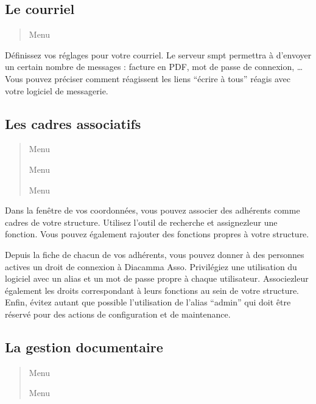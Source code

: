 \documentclass[a4paper,10pt,oneside,french]{sphinxmanual}
\begin{document}
\subsection{Le courriel}
\label{\detokenize{asso/first_step:le-courriel}}\begin{quote}

\sphinxAtStartPar
Menu 
\end{quote}

\sphinxAtStartPar
Définissez vos réglages pour votre courriel.
Le serveur smpt permettra à  d’envoyer un certain nombre de messages : facture en PDF, mot de passe de connexion, …
Vous pouvez préciser comment réagissent les liens “écrire à tous” réagis avec votre logiciel de messagerie.


\subsection{Les cadres associatifs}
\label{\detokenize{asso/first_step:les-cadres-associatifs}}\begin{quote}

\sphinxAtStartPar
Menu 

\sphinxAtStartPar
Menu 

\sphinxAtStartPar
Menu 
\end{quote}

\sphinxAtStartPar
Dans la fenêtre de vos coordonnées, vous pouvez associer des adhérents comme cadres de votre structure.
Utilisez l’outil de recherche et assignez\sphinxhyphen{}leur une fonction.
Vous pouvez également rajouter des fonctions propres à votre structure.

\sphinxAtStartPar
Depuis la fiche de chacun de vos adhérents, vous pouvez donner à des personnes actives un droit de connexion à Diacamma Asso.
Privilégiez une utilisation du logiciel avec un alias et un mot de passe propre à chaque utilisateur. Associez\sphinxhyphen{}leur également les droits correspondant à leurs fonctions au sein de votre structure.
Enfin, évitez autant que possible l’utilisation de l’alias “admin” qui doit être réservé pour des actions de configuration et de maintenance.


\subsection{La gestion documentaire}
\label{\detokenize{asso/first_step:la-gestion-documentaire}}\begin{quote}

\sphinxAtStartPar
Menu 

\sphinxAtStartPar
Menu 
\end{quote}
\end{document}
